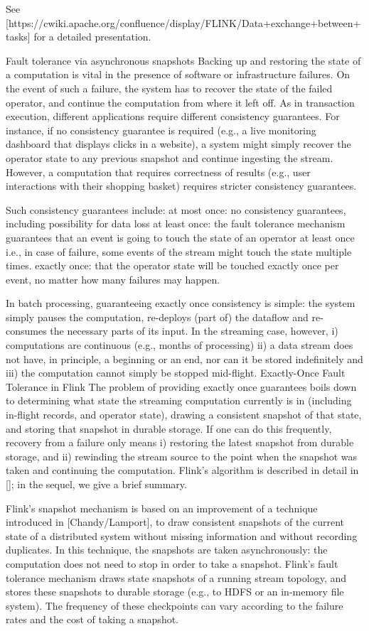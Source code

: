 \documentclass{sig-alternate}
\begin{document}
See [https://cwiki.apache.org/confluence/display/FLINK/Data+exchange+between+tasks] for a detailed presentation.

Fault tolerance via asynchronous snapshots
Backing up and restoring the state of a computation is vital in the presence of software or infrastructure failures. On the event of such a failure, the system has to recover the state of the failed operator, and continue the computation from where it left off. As in transaction execution, different applications require different consistency guarantees. For instance, if no consistency guarantee is required (e.g., a live monitoring dashboard that displays clicks in a website), a system might simply recover the operator state to any previous snapshot and continue ingesting the stream. However, a computation that requires correctness of results (e.g., user interactions with their shopping basket) requires stricter consistency guarantees.

Such consistency guarantees include:
at most once: no consistency guarantees, including possibility for data loss 
at least once: the fault tolerance mechanism guarantees that an event is going to touch the state of an operator at least once i.e., in case of failure, some events of the stream might touch the state multiple times.
exactly once: that the operator state will be touched exactly once per event, no matter how many failures may happen.

In batch processing, guaranteeing exactly once consistency is simple: the system simply pauses the computation, re-deploys (part of) the dataflow and re-consumes the necessary parts of its input. In the streaming case, however, i) computations are continuous (e.g., months of processing) ii) a data stream does not have, in principle, a beginning or an end, nor can it be stored indefinitely and iii) the computation cannot simply be stopped mid-flight.
Exactly-Once Fault Tolerance in Flink
The problem of providing exactly once guarantees boils down to determining what state the streaming computation currently is in (including in-flight records, and operator state), drawing a consistent snapshot of that state, and storing that snapshot in durable storage. If one can do this frequently, recovery from a failure only means i) restoring the latest snapshot from durable storage, and ii) rewinding the stream source to the point when the snapshot was taken and continuing the computation. Flink’s algorithm is described in detail in []; in the sequel, we give a brief summary.

Flink’s snapshot mechanism is based on an improvement of a technique introduced in [Chandy/Lamport], to draw consistent snapshots of the current state of a distributed system without missing information and without recording duplicates. In this technique, the snapshots are taken asynchronously: the computation does not need to stop in order to take a snapshot. Flink’s fault tolerance mechanism draws state snapshots of a running stream topology, and stores these snapshots to durable storage (e.g., to HDFS or an in-memory file system). The frequency of these checkpoints can vary according to the failure rates and the cost of taking a snapshot.
\end{document}
